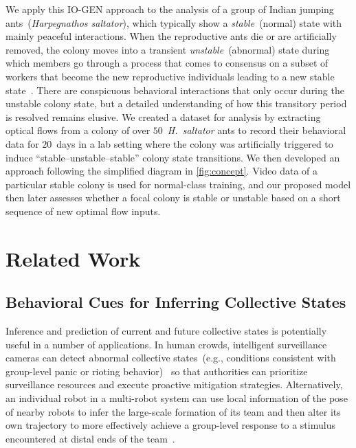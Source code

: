 \documentclass[letterpaper]{article} %
\let\orgautoref\autoref
\renewcommand{\autoref}
{\def\equationautorefname{Equation}%
	\def\figureautorefname{Fig.}%
	\def\subfigureautorefname{Fig.}%
	\def\Itemautorefname{item}%
	\def\tableautorefname{Table}%
	\def\exerciseautorefname{Exercise}%
	\def\starexerciseautorefname{Exercise}%
	\def\sectionautorefname{Section}%
	\def\subsectionautorefname{Section}%
	\def\subsubsectionautorefname{Section}%
	\def\chapterautorefname{Section}%
	\def\partautorefname{Part}%
	\orgautoref}
\begin{document}
We apply this \mbox{IO-GEN} approach to the analysis of a group of Indian
jumping ants~(\emph{Harpegnathos saltator}), which typically show a
\emph{stable}~(normal) state with mainly peaceful interactions.
When the reproductive ants die or are artificially removed,
the colony moves into a transient \emph{unstable}~(abnormal) state during
which members go through a process that comes to consensus on a subset of
workers that become the new reproductive individuals leading to a
new stable state~\citep{SPSHPL16}.
There are conspicuous behavioral interactions that only occur during
the unstable colony state, but a detailed understanding of how this
transitory period is resolved remains elusive.
We created a dataset for analysis by
extracting optical flows from a colony of over $50$~\emph{H.~saltator}
ants to record their behavioral data for $20$~days in a lab setting
where the colony was artificially triggered to induce
``stable--unstable--stable'' colony state transitions. We then developed
an approach following the simplified diagram in \autoref{fig:concept}.
Video data of a particular stable colony is used for normal-class
training, and our proposed model then later assesses whether a focal
colony is stable or unstable based on a short sequence of new optimal
flow inputs.







\section{Related Work}
\label{sec:related_work}

\subsection{Behavioral Cues for Inferring Collective States}
\label{sec:behavioral_cues_to_differentiate_collective_states}

Inference and prediction of current and future collective states is
potentially useful in a number of applications. In human crowds,
intelligent surveillance cameras can detect abnormal collective
states~(e.g., conditions consistent with group-level panic or rioting
behavior)~\citep{MOS09} so that authorities can prioritize surveillance
resources and execute proactive mitigation strategies. Alternatively, an
individual robot in a multi-robot system can use local information of
the pose of nearby robots to infer the large-scale formation of its team
and then alter its own trajectory to more effectively achieve a
group-level response to a stimulus encountered at distal ends of the
team~\citep{CPR17, CKP20}.
\end{document}
